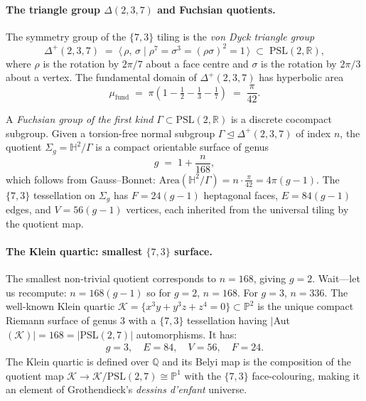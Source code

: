 \documentclass[11pt,oneside]{amsbook}
\numberwithin{equation}{section}
\theoremstyle{plain}
\theoremstyle{definition}
\theoremstyle{remark}
\begin{document}
\paragraph{The triangle group $\Delta(2,3,7)$ and Fuchsian quotients.}
The symmetry group of the $\{7,3\}$ tiling is the \emph{von Dyck triangle
group}
\begin{equation}
  \Delta^+(2,3,7) \;=\;
  \bigl\langle\, \rho,\, \sigma \;\big|\;
  \rho^7 = \sigma^3 = (\rho\sigma)^2 = 1\,\bigr\rangle
  \;\subset\; \mathrm{PSL}(2,\mathbb{R}),
\label{eq:triangle_group_hk}
\end{equation}
where $\rho$ is the rotation by $2\pi/7$ about a face centre and $\sigma$ is
the rotation by $2\pi/3$ about a vertex.  The fundamental domain of
$\Delta^+(2,3,7)$ has hyperbolic area
\[
  \mu_{\mathrm{fund}} \;=\; \pi\!\left(1-\tfrac{1}{2}-\tfrac{1}{3}-\tfrac{1}{7}\right)
  \;=\; \frac{\pi}{42}.
\]

A \emph{Fuchsian group of the first kind} $\Gamma \subset \mathrm{PSL}(2,\mathbb{R})$
is a discrete cocompact subgroup.  Given a torsion-free normal subgroup
$\Gamma \trianglelefteq \Delta^+(2,3,7)$ of index $n$, the quotient
$\Sigma_g = \mathbb{H}^2 / \Gamma$ is a compact orientable surface of genus
\begin{equation}
  g \;=\; 1 + \frac{n}{168},
\label{eq:genus_index}
\end{equation}
which follows from Gauss--Bonnet:
$\mathrm{Area}(\mathbb{H}^2/\Gamma) = n\cdot\frac{\pi}{42} = 4\pi(g-1)$.
The $\{7,3\}$ tessellation on $\Sigma_g$ has $F = 24(g-1)$ heptagonal faces,
$E = 84(g-1)$ edges, and $V = 56(g-1)$ vertices, each inherited from the
universal tiling by the quotient map.

\paragraph{The Klein quartic: smallest $\{7,3\}$ surface.}
The smallest non-trivial quotient corresponds to $n = 168$, giving $g = 2$.
Wait---let us recompute: $n = 168(g-1)$ so for $g=2$, $n=168$.  For $g=3$,
$n=336$.  The well-known Klein quartic $\mathcal{K} = \{x^3y+y^3z+z^4=0\}
\subset \mathbb{P}^2$ is the unique compact Riemann surface of genus $3$
with a $\{7,3\}$ tessellation having $|$Aut$(\mathcal{K})| = 168
= |$PSL$(2,7)|$ automorphisms.  It has:
\begin{align*}
  g = 3, \quad E = 84, \quad V = 56, \quad F = 24.
\end{align*}
The Klein quartic is defined over $\mathbb{Q}$ and its Belyi map is the
composition of the quotient map $\mathcal{K}\to\mathcal{K}/\mathrm{PSL}(2,7)
\cong \mathbb{P}^1$ with the $\{7,3\}$ face-colouring, making it an element
of Grothendieck's \emph{dessins d'enfant} universe.
\end{document}
